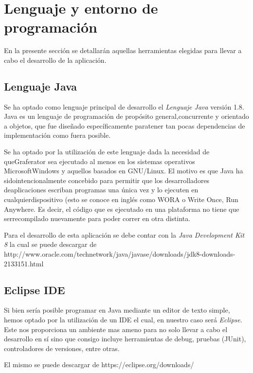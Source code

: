 \documentclass{book}
\begin{document}
\section{Lenguaje y entorno de programación}

En la presente sección se detallarán aquellas herramientas elegidas para llevar a cabo el desarrollo de la aplicación. 
\bigskip


\subsection{Lenguaje Java}

Se ha optado como lenguaje principal de desarrollo el \textit{Lenguaje Java} versión 1.8. Java es un lenguaje de programación de propósito general,concurrente y orientado a objetos, que fue diseñado específicamente paratener tan pocas dependencias de implementación como fuera posible.
\par
Se ha optado por la utilización de este lenguaje dada la necesidad de queGraferator sea ejecutado al menos en los sistemas operativos MicrosoftWindows y aquellos basados en GNU/Linux. El motivo es que Java ha sidointencionalmente concebido para permitir que los desarrolladores deaplicaciones escriban programas una única vez y lo ejecuten en cualquierdispositivo (esto se conoce en inglés como WORA o Write Once, Run Anywhere. Es decir, el código que es ejecutado en una plataforma no tiene que serrecompilado nuevamente para poder correr en otra distinta.
\par
Para el desarrollo de esta aplicación se debe contar con la \textit{Java Development Kit 8} la cual se puede descargar de http://www.oracle.com/technetwork/java/javase/downloads/jdk8-downloads-2133151.html
\medskip


\subsection{Eclipse IDE}

Si bien sería posible programar en Java mediante un editor de texto simple, hemos optado por la utilización de un IDE el cual, en nuestro caso será \textit{Eclipse}. Este nos proporciona un ambiente mas ameno para no solo llevar a cabo el desarrollo en sí sino que consigo incluye herramientas de debug, pruebas (JUnit), controladores de versiones, entre otras.
\par
El mismo se puede descargar de https://eclipse.org/downloads/
\medskip
\end{document}
